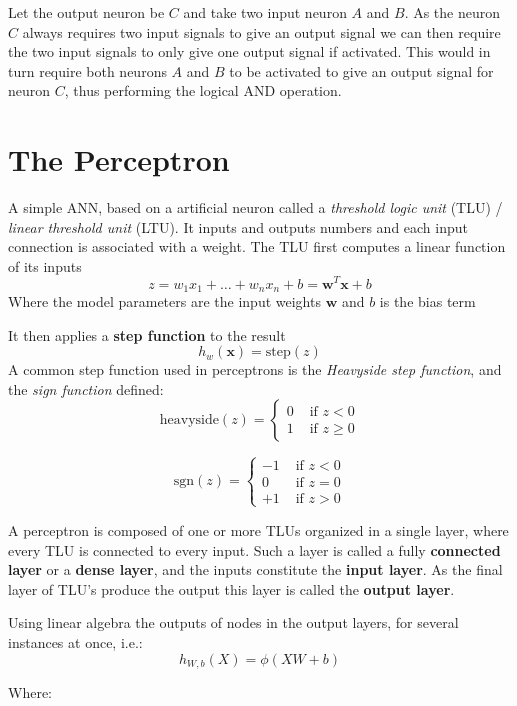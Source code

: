 \documentclass[12pt letter]{report}
\begin{document}
Let the output neuron be \(C\) and take two input neuron \(A\) and
\(B\). As the neuron \(C\) always requires two input signals to give an
output signal we can then require the two input signals to only give one
output signal if activated. This would in turn require both neurons
\(A\) and \(B\) to be activated to give an output signal for neuron
\(C\), thus performing the logical AND operation.

\section{The Perceptron}\label{the-perceptron}

A simple ANN, based on a artificial neuron called a \emph{threshold
logic unit} (TLU) / \emph{linear threshold unit} (LTU). It inputs and
outputs numbers and each input connection is associated with a weight.
The TLU first computes a linear function of its inputs \[
z = w_1 x_1 + \ldots + w_n x_n + b = \mathbf{w}^T \mathbf{x} + b
\] Where the model parameters are the input weights \(\mathbf{w}\) and
\(b\) is the bias term

It then applies a \textbf{step function} to the result \[
h_w(\mathbf{x}) = \text{step}(z)
\] A common step function used in perceptrons is the \emph{Heavyside
step function}, and the \emph{sign function} defined: \[
\text{heavyside}(z) = \begin{cases}
0 & \text{ if } z < 0 \\
1 & \text{ if } z \ge 0
\end{cases}
\]

\[
\text{sgn}(z) = \begin{cases}
-1 & \text{ if } z < 0 \\
0 & \text{ if } z = 0 \\
+1 & \text{ if } z > 0
\end{cases}
\]

A perceptron is composed of one or more TLUs organized in a single
layer, where every TLU is connected to every input. Such a layer is
called a fully \textbf{connected layer} or a \textbf{dense layer}, and
the inputs constitute the \textbf{input layer}. As the final layer of
TLU's produce the output this layer is called the \textbf{output layer}.

Using linear algebra the outputs of nodes in the output layers, for
several instances at once, i.e.: \[
h_{W, b} (X) = \phi (XW + b)
\]

Where:
\end{document}
